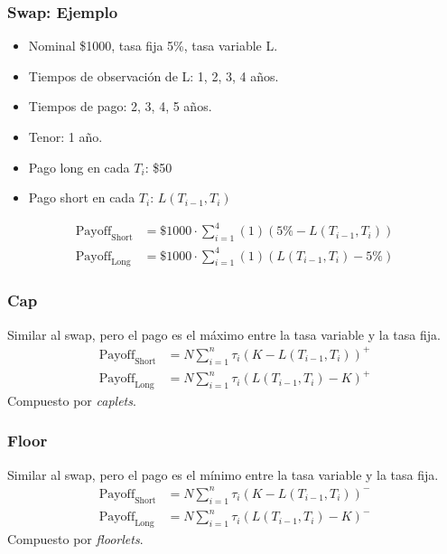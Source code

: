 
\begin{frame}
    \frametitle{Swap: Ejemplo}
    \begin{itemize}
        \item Nominal \$1000, tasa fija 5\%, tasa variable L.
        \item Tiempos de observación de L: 1, 2, 3, 4 años.
        \item Tiempos de pago: 2, 3, 4, 5 años.
        \item Tenor: 1 año.
        \item Pago long en cada $T_i$: \$50
        \item Pago short en cada $T_i$: $L(T_{i-1}, T_i)$
    \end{itemize}
    \begin{align*}
        \text{Payoff}_{\text{Short}} &= \$1000 \cdot \sum_{i=1}^4 (1) (5\% - L(T_{i-1}, T_i)) \\
        \text{Payoff}_{\text{Long}} &= \$1000 \cdot \sum_{i=1}^4 (1) (L(T_{i-1}, T_i) - 5\%)
    \end{align*}
\end{frame}


\begin{frame}
    \frametitle{Cap}
    \begin{defin}[Cap]
        Similar al swap, pero el pago es el máximo entre la tasa variable y la tasa fija.
        \begin{align*}
            \text{Payoff}_{\text{Short}} &= N \sum_{i=1}^n \tau_i (K - L(T_{i-1}, T_i))^+ \\
            \text{Payoff}_{\text{Long}} &= N \sum_{i=1}^n \tau_i (L(T_{i-1}, T_i) - K)^+
        \end{align*}
        Compuesto por \textit{caplets}.
    \end{defin}
\end{frame}


\begin{frame}
    \frametitle{Floor}
    \begin{defin}[Floor]
        Similar al swap, pero el pago es el mínimo entre la tasa variable y la tasa fija.
        \begin{align*}
            \text{Payoff}_{\text{Short}} &= N \sum_{i=1}^n \tau_i (K - L(T_{i-1}, T_i))^- \\
            \text{Payoff}_{\text{Long}} &= N \sum_{i=1}^n \tau_i (L(T_{i-1}, T_i) - K)^-
        \end{align*}
        Compuesto por \textit{floorlets}.
    \end{defin}
\end{frame}

